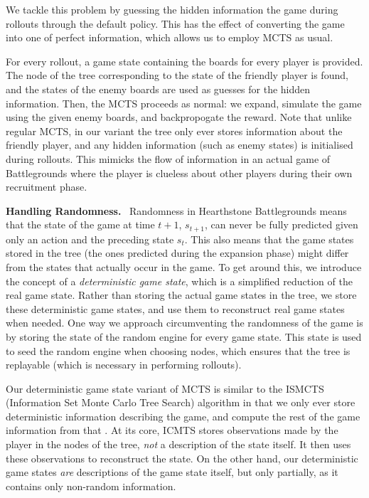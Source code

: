 \documentclass{paper}
\newcommand{\inlineSection}[1]{\vspace{0.5em}\noindent\textbf{#1.}~}
\begin{document}
We tackle this problem by guessing the hidden information the game during rollouts through the default policy. This has the effect of converting the game into one of perfect information, which allows us to employ MCTS as usual.

For every rollout, a game state containing the boards for every player is provided. The node of the tree corresponding to the state of the friendly player is found, and the states of the enemy boards are used as guesses for the hidden information. Then, the MCTS proceeds as normal: we expand, simulate the game using the given enemy boards, and backpropogate the reward. Note that unlike regular MCTS, in our variant the tree only ever stores information about the friendly player, and any hidden information (such as enemy states) is initialised during rollouts. This mimicks the flow of information in an actual game of Battlegrounds where the player is clueless about other players during their own recruitment phase.


\inlineSection{Handling Randomness} Randomness in Hearthstone Battlegrounds means that the state of the game at time $t+1$, $s_{t+1}$, can never be fully predicted given only an action and the preceding state $s_t$. This also means that the game states stored in the tree (the ones predicted during the expansion phase) might differ from the states that actually occur in the game. To get around this, we introduce the concept of a \textit{deterministic game state}, which is a simplified reduction of the real game state. Rather than storing the actual game states in the tree, we store these deterministic game states, and use them to reconstruct real game states when needed. One way we approach circumventing the randomness of the game is by storing the state of the random engine for every game state. This state is used to seed the random engine when choosing nodes, which ensures that the tree is replayable (which is necessary in performing rollouts).

Our deterministic game state variant of MCTS is similar to the ISMCTS (Information Set Monte Carlo Tree Search) algorithm in that we only ever store deterministic information describing the game, and compute the rest of the game information from that \cite{cowling_2012}. At its core, ICMTS stores observations made by the player in the nodes of the tree, \textit{not} a description of the state itself. It then uses these observations to reconstruct the state. On the other hand, our deterministic game states \textit{are} descriptions of the game state itself, but only partially, as it contains only non-random information. 
\end{document}

